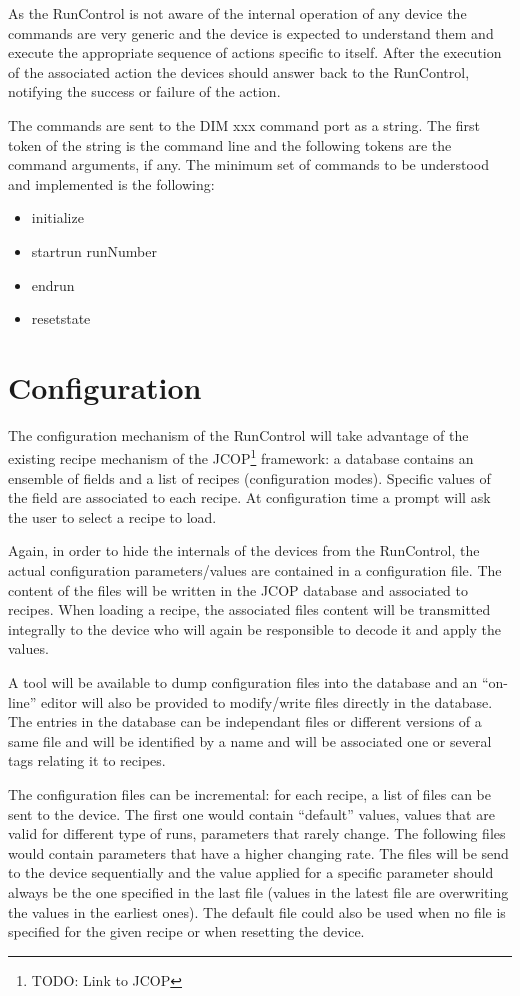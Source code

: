 \documentclass[a4paper]{article}
\newcommand{\note}[1]{\footnote{TODO: {#1}}}
\begin{document}
As the RunControl is not aware of the internal operation of any device the commands are very generic
and the device is expected to understand them and execute the appropriate sequence of actions
specific to itself. After the execution of the associated action the devices should answer back to
the RunControl, notifying the success or failure of the action.
 

The commands are sent to the DIM xxx command port as a string. The first token of the string is the
command line and the following tokens are the command arguments, if any. The minimum set of
commands to be understood and implemented is the following:
\begin{itemize}
  \item initialize 
  \item startrun runNumber
  \item endrun
  \item resetstate
\end{itemize}

\section{Configuration}
The configuration mechanism of the RunControl will take advantage of the existing recipe mechanism
of the JCOP\note{Link to JCOP} framework: a database contains an ensemble of fields and a list of
recipes (configuration modes). Specific values of the field are associated to each recipe. At
configuration time a prompt will ask the user to select a recipe to load.

Again, in order to hide the internals of the devices from the RunControl, the actual configuration
parameters/values are contained in a configuration file. The content of the files will be written in
the JCOP database and associated to recipes. When loading a recipe, the associated files content
will be transmitted integrally to the device who will again be responsible to decode it and apply
the values.

A tool will be available to dump configuration files into the database and an ``on-line'' editor will
also be provided to modify/write files directly in the database. The entries in the database can be
independant files or different versions of a same file and will be identified by a name and will
be associated one or several tags relating it to recipes.

The configuration files can be incremental: for each recipe, a list of files can be sent to the
device. The first one would contain ``default'' values, values that are valid for different type of
runs, parameters that rarely change. The following files would contain parameters that have a higher changing rate.
The files will be send to the device sequentially and the value applied for a specific parameter
should always be the one specified in the last file (values in the latest file are overwriting the
values in the earliest ones). The default file could also be used when no file is specified for the
given recipe or when resetting the device.
\end{document}
